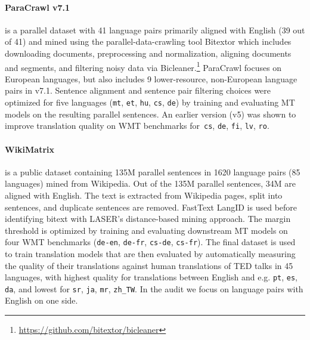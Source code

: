 \paragraph{ParaCrawl v7.1} is a parallel dataset with 41 language pairs primarily aligned with English (39 out of 41) and mined using the parallel-data-crawling tool Bitextor \citep{espla-etal-2019-paracrawl,banon-etal-2020-paracrawl} which includes downloading documents, preprocessing and normalization, aligning documents and segments, and filtering noisy data via Bicleaner.\footnote{\url{https://github.com/bitextor/bicleaner}}
ParaCrawl focuses on European languages, but also includes 9 lower-resource, non-European language pairs in v7.1.
Sentence alignment and sentence pair filtering choices were optimized for five languages (\texttt{mt}, \texttt{et}, \texttt{hu}, \texttt{cs}, \texttt{de}) by training and evaluating MT models on the resulting parallel sentences. An earlier version (v5) was shown to improve translation quality on WMT benchmarks for~\texttt{cs}, \texttt{de}, \texttt{fi}, \texttt{lv}, \texttt{ro}.


\paragraph{WikiMatrix~\citep{schwenk-etal-2021-wikimatrix}} is a public dataset containing 135M parallel sentences in 1620 language pairs (85 languages) mined from Wikipedia. Out of the 135M parallel sentences, 34M are aligned with English. %
The text is extracted from Wikipedia pages, split into sentences, and duplicate sentences are removed. FastText LangID is used before identifying bitext with LASER's distance-based mining approach.
The margin threshold is optimized by training and evaluating downstream MT models on four WMT benchmarks (\texttt{de-en}, \texttt{de-fr}, \texttt{cs-de}, \texttt{cs-fr}). The final dataset is used to train translation models that are then evaluated by automatically measuring the quality of their translations against human translations of TED talks in 45 languages, with highest quality for translations between English and e.g. \texttt{pt}, \texttt{es}, \texttt{da}, and lowest for \texttt{sr}, \texttt{ja}, \texttt{mr}, \texttt{zh\_TW}.
In the audit we focus on language pairs with English on one side.
